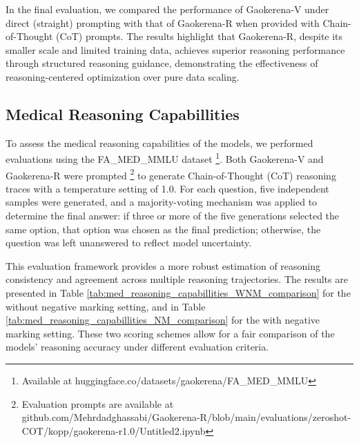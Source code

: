 \documentclass[conference]{IEEEtran}
\begin{document}
In the final evaluation, we compared the performance of Gaokerena-V under direct (straight) prompting with that of Gaokerena-R when provided with Chain-of-Thought (CoT) prompts. The results highlight that Gaokerena-R, despite its smaller scale and limited training data, achieves superior reasoning performance through structured reasoning guidance, demonstrating the effectiveness of reasoning-centered optimization over pure data scaling.
          \subsection{Medical Reasoning Capabillities}
To assess the medical reasoning capabilities of the models, we performed evaluations using the FA\_MED\_MMLU dataset
\footnote{Available at huggingface.co/datasets/gaokerena/FA\_MED\_MMLU}.
 Both Gaokerena-V and Gaokerena-R were prompted
\footnote{Evaluation prompts are available at github.com/Mehrdadghassabi/Gaokerena-R/blob/main/evaluations/zeroshot-COT/kopp/gaokerena-r1.0/Untitled2.ipynb} 
to generate Chain-of-Thought (CoT) reasoning traces with a temperature setting of 1.0. For each question, five independent samples were generated, and a majority-voting mechanism was applied to determine the final answer: if three or more of the five generations selected the same option, that option was chosen as the final prediction; otherwise, the question was left unanswered to reflect model uncertainty.  

This evaluation framework provides a more robust estimation of reasoning consistency and agreement across multiple reasoning trajectories. The results are presented in Table
\ref{tab:med_reasoning_capabillities_WNM_comparison}
 for the without negative marking setting, and in Table
\ref{tab:med_reasoning_capabillities_NM_comparison}
 for the with negative marking setting. These two scoring schemes allow for a fair comparison of the models’ reasoning accuracy under different evaluation criteria.
\end{document}
